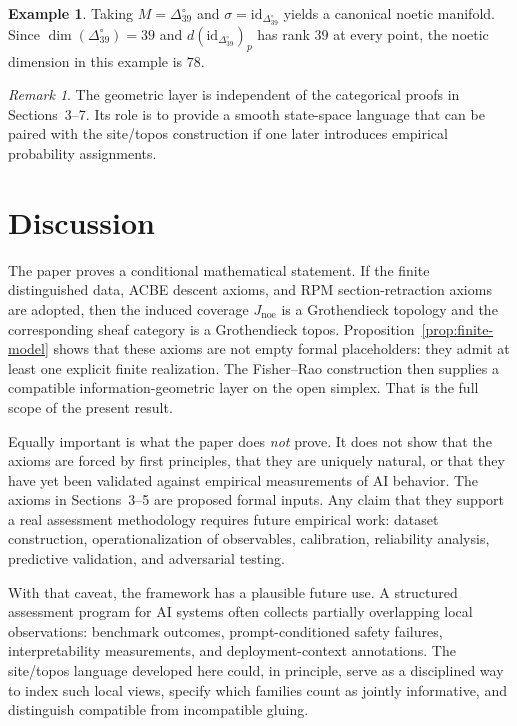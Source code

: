 \documentclass[11pt]{amsart}
\numberwithin{equation}{section}
\theoremstyle{definition}
\newtheorem{example}[theorem]{Example}
\theoremstyle{remark}
\newtheorem{remark}[theorem]{Remark}
\newcommand{\id}{\mathrm{id}}
\newcommand{\Jnoe}{J_{\mathrm{noe}}}
\newcommand{\Deltaopen}{\Delta_{39}^{\circ}}
\begin{document}
\begin{example}
Taking \(M=\Deltaopen\) and \(\sigma=\id_{\Deltaopen}\) yields a canonical noetic manifold. Since \(\dim(\Deltaopen)=39\) and \(d(\id_{\Deltaopen})_p\) has rank \(39\) at every point, the noetic dimension in this example is \(78\).
\end{example}

\begin{remark}
The geometric layer is independent of the categorical proofs in Sections~3--7. Its role is to provide a smooth state-space language that can be paired with the site/topos construction if one later introduces empirical probability assignments.
\end{remark}

\section{Discussion}

The paper proves a conditional mathematical statement. If the finite distinguished data, ACBE descent axioms, and RPM section-retraction axioms are adopted, then the induced coverage \(\Jnoe\) is a Grothendieck topology and the corresponding sheaf category is a Grothendieck topos. Proposition~\ref{prop:finite-model} shows that these axioms are not empty formal placeholders: they admit at least one explicit finite realization. The Fisher--Rao construction then supplies a compatible information-geometric layer on the open simplex. That is the full scope of the present result.

Equally important is what the paper does \emph{not} prove. It does not show that the axioms are forced by first principles, that they are uniquely natural, or that they have yet been validated against empirical measurements of AI behavior. The axioms in Sections~3--5 are proposed formal inputs. Any claim that they support a real assessment methodology requires future empirical work: dataset construction, operationalization of observables, calibration, reliability analysis, predictive validation, and adversarial testing.

With that caveat, the framework has a plausible future use. A structured assessment program for AI systems often collects partially overlapping local observations: benchmark outcomes, prompt-conditioned safety failures, interpretability measurements, and deployment-context annotations. The site/topos language developed here could, in principle, serve as a disciplined way to index such local views, specify which families count as jointly informative, and distinguish compatible from incompatible gluing.
\end{document}
